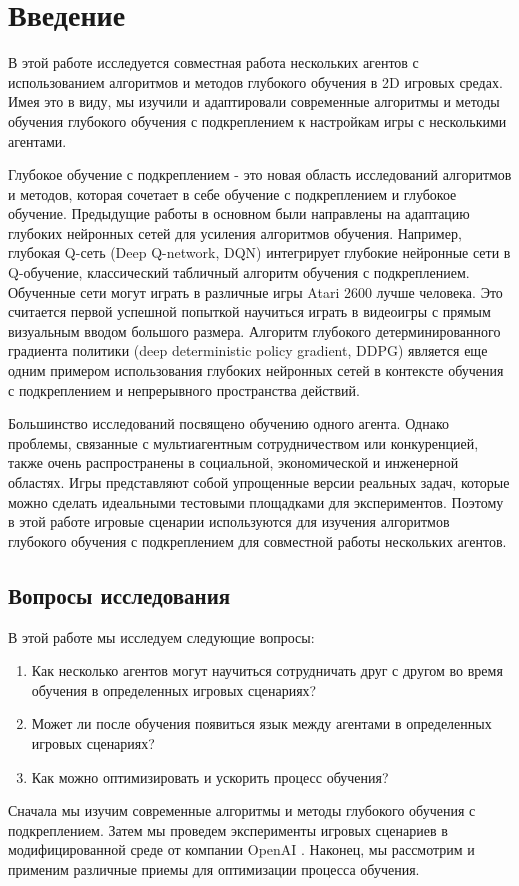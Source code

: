 \chapter*{Введение} %

В этой работе исследуется совместная работа нескольких агентов с использованием алгоритмов и методов глубокого обучения в 2D игровых средах. Имея это в виду, мы изучили и адаптировали современные алгоритмы и методы обучения глубокого обучения с подкреплением к настройкам игры с несколькими агентами.

Глубокое обучение с подкреплением - это новая область исследований алгоритмов и методов, которая сочетает в себе обучение с подкреплением и глубокое обучение. Предыдущие работы в основном были направлены на адаптацию глубоких нейронных сетей для усиления алгоритмов обучения. Например, глубокая Q-сеть (Deep Q-network, DQN) \cite{Mnih2015} интегрирует глубокие нейронные сети в Q-обучение, классический табличный алгоритм обучения с подкреплением. Обученные сети могут играть в различные игры Atari 2600 \cite{Bellemare_2013} лучше человека. Это считается первой успешной попыткой научиться играть в видеоигры с прямым визуальным вводом большого размера. Алгоритм глубокого детерминированного градиента политики (deep deterministic policy gradient, DDPG) \cite{lillicrap2015continuous} является еще одним примером использования глубоких нейронных сетей в контексте обучения с подкреплением и непрерывного пространства действий.

Большинство исследований посвящено обучению одного агента. Однако проблемы, связанные с мультиагентным сотрудничеством или конкуренцией, также очень распространены в социальной, экономической и инженерной областях. Игры представляют собой упрощенные версии реальных задач, которые можно сделать идеальными тестовыми площадками для экспериментов. Поэтому в этой работе игровые сценарии используются для изучения алгоритмов глубокого обучения с подкреплением для совместной работы нескольких агентов.

\section{Вопросы исследования} \label{intro:sec1}

В этой работе мы исследуем следующие вопросы:
\begin{enumerate}[1.]
	\item Как несколько агентов могут научиться сотрудничать друг с другом во время обучения в определенных игровых сценариях?
	\item Может ли после обучения появиться язык между агентами в определенных игровых сценариях?
	\item Как можно оптимизировать и ускорить процесс обучения?
\end{enumerate}
Сначала мы изучим современные алгоритмы и методы глубокого обучения с подкреплением. Затем мы проведем эксперименты игровых сценариев в модифицированной среде от компании OpenAI \cite{OpenAI-Gym}. Наконец, мы рассмотрим и применим различные приемы для оптимизации процесса обучения.


